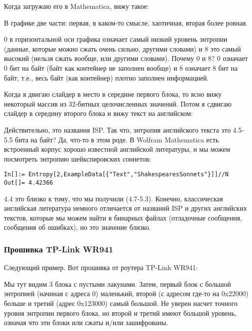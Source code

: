 Когда загружаю его в Mathematica, вижу такое:



В графике две части: первая, в каком-то смысле, хаотичная, вторая более ровная.

0 в горизонтальной оси графика означает самый низкий уровень энтропии
(данные, которые можно сжать очень сильно,  другими словами) 
и 8 это самый высокий (нельзя сжать вообще,  или  другими словами).
Почему 0 и 8? 0 означает 0 бит на байт (байт как контейнер не заполнен вообще) 
и 8 означает 8 бит на байт, т.е., весь байт (как контейнер) плотно заполнен информацией.

Когда я двигаю слайдер в место в середине первого блока, то ясно вижу некоторый массив из 32-битных целочисленных значений.
Потом я сдвигаю слайдер в середину второго блока и вижу текст на английском:



Действительно, это названия ISP.
Так что, энтропия английского текста это 4.5-5.5 бита на байт? Да, что-то в этом роде.
В Wolfram Mathematica есть встроенный корпус хорошо известной английской литературы, и мы можем посмотреть энтропию
шейкспировских соннетов:

\begin{lstlisting}[style=custommath]
In[]:= Entropy[2,ExampleData[{"Text","ShakespearesSonnets"}]]//N
Out[]= 4.42366
\end{lstlisting}

4.4 это близко к тому, что мы получили (4.7-5.3). 
Конечно, классическая английская литература немного отличается от названий ISP и других английских текстов, которые мы
можем найти в бинарных файлах (отладочные сообщения, сообщения об ошибках), но это значение близко.

\subsubsection{Прошивка TP-Link WR941}

Следующий пример. Вот прошивка от роутера TP-Link WR941:



Мы тут видим 3 блока с пустыми лакунами.
Затем, первый блок с большой энтропией (начиная с адреса 0) маленький,
второй (с адресом где-то на 0x22000) больше и третий (адрес 0x123000) самый
большой.
Не уверен насчет точного уровня энтропии первого блока, но второй и третий имеют большой уровень, означая что эти блоки
или сжаты и/или зашифрованы.

